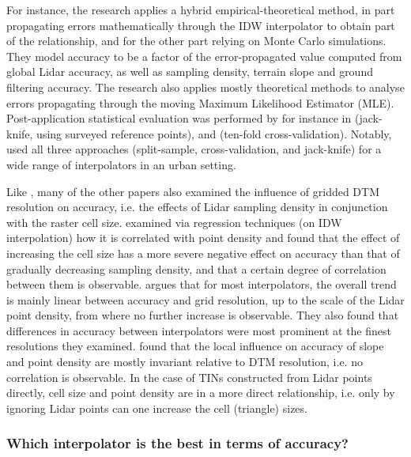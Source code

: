 For instance, the research \cite{aguilar_etal_2010} applies a hybrid empirical-theoretical method, in part propagating errors mathematically through the IDW interpolator to obtain part of the relationship, and for the other part relying on Monte Carlo simulations. They model accuracy to be a factor of the error-propagated value computed from global Lidar accuracy, as well as sampling density, terrain slope and ground filtering accuracy. The research \cite{kraus_etal_2006} also applies mostly theoretical methods to analyse errors propagating through the moving Maximum Likelihood Estimator (MLE). Post-application statistical evaluation was performed by for instance in \cite{peng_shih_2006} (jack-knife, using surveyed reference points), and \cite{guo_etal_2010} (ten-fold cross-validation). Notably, \cite{smith_etal_2005} used all three approaches (split-sample, cross-validation, and jack-knife) for a wide range of interpolators in an urban setting.

Like \cite{aguilar_etal_2010}, many of the other papers also examined the influence of gridded DTM resolution on accuracy, i.e. the effects of Lidar sampling density in conjunction with the raster cell size. \cite{chow_hodgson_2009} examined via regression techniques (on IDW interpolation) how it is correlated with point density and found that the effect of increasing the cell size has a more severe negative effect on accuracy than that of gradually decreasing sampling density, and that a certain degree of correlation between them is observable. \cite{guo_etal_2010} argues that for most interpolators, the overall trend is mainly linear between accuracy and grid resolution, up to the scale of the Lidar point density, from where no further increase is observable. They also found that differences in accuracy between interpolators were most prominent at the finest resolutions they examined. \cite{bater_coops_2009} found that the local influence on accuracy of slope and point density are mostly invariant relative to DTM resolution, i.e. no correlation is observable. In the case of TINs constructed from Lidar points directly, cell size and point density are in a more direct relationship, i.e. only by ignoring Lidar points can one increase the cell (triangle) sizes.

\subsubsection{Which interpolator is the best in terms of accuracy?}

